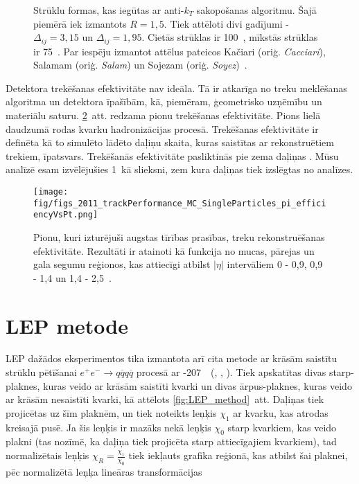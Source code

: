 \begin{figure}[hbtp]
  \def\twidth{0.5}
  \hfil%
   \caption{Strūklu formas, kas iegūtas ar anti-$k_{T}$ sakopošanas algoritmu. Šajā piemērā iek izmantots $R=1,5$. Tiek attēloti divi gadījumi - $\Delta_{ij}=3,15$ un  $\Delta_{ij}=1,95$. Cietās strūklas \pt ir 100~\GeV, mīkstās strūklas \pt ir 75~\GeV. Par iespēju izmantot attēlus pateicos Kačiari (oriģ. {\it Cacciari}), Salamam (oriģ. {\it Salam}) un Sojezam (oriģ. {\it Soyez})~\cite{github:antikt}.}
  \label{fig:anti_kt}
\end{figure}

Detektora trekēšanas efektivitāte nav ideāla. Tā ir atkarīga no treku meklēšanas algoritma un detektora īpašībām, kā, piemēram, ģeometrisko \gls{uzņēmību} un materiālu saturu. \ref{fig:2011_trackPerformance_MC_SingleParticles_pi_efficiencyVsPt}~att. redzama pionu trekēšanas efektivitāte. Pions lielā daudzumā rodas kvarku hadronizācijas procesā. Trekēšanas efektivitāte ir definēta kā to simulēto lādēto daļiņu skaita, kuras saistītas ar rekonstruētiem trekiem, īpatsvars. Trekēšanās efektivitāte pasliktinās pie zema daļiņas \pt. Mūsu analīzē esam izvēlējušies 1~\GeV kā \pt slieksni, zem kura daļiņas tiek izslēgtas no analīzes.

\begin{figure}[hbtp]
    \texttt{[image: fig/figs\_2011\_trackPerformance\_MC\_SingleParticles\_pi\_efficiencyVsPt.png]}
    \caption{Pionu, kuri izturējuši augstas tīrības prasības, treku rekonstruēšanas efektivitāte. Rezultāti ir atainoti kā funkcija no \pt mucas, pārejas un gala segumu reģionos, kas attiecīgi atbilst $\left|\eta\right|$ intervāliem 0 - 0,9, 0,9 - 1,4 un 1,4 - 2,5~\cite{Chatrchyan:2014fea}.}
    \label{fig:2011_trackPerformance_MC_SingleParticles_pi_efficiencyVsPt}
\end{figure}

\section{LEP metode}

LEP dažādos eksperimentos tika izmantota arī cita metode ar krāsām saistītu strūklu pētīšanai $e^{+}e^{-}\rightarrow q\overline{q}q\overline{q}$ procesā ar -207~\GeV~(\cite{Abdallah:2006uq}, \cite{Abbiendi:2005es}, \cite{Achard:2003pe}). Tiek apskatītas divas starp-\PW plaknes, kuras veido ar krāsām saistīti kvarki un divas ārpus-\PW plaknes, kuras veido ar krāsām nesaistīti kvarki, kā attēlots \ref{fig:LEP_method}~att. Daļiņas tiek projicētas uz šīm plaknēm, un tiek noteikts leņķis $\chi_{1}$ ar kvarku, kas atrodas kreisajā pusē. Ja šis leņķis ir mazāks nekā leņķis $\chi_{0}$ starp kvarkiem, kas veido plakni (tas nozīmē, ka daļiņa tiek projicēta starp attiecīgajiem kvarkiem), tad normalizētais leņķis $\chi_{R}=\frac{\chi_{1}}{\chi_{0}}$ tiek iekļauts grafika reģionā, kas atbilst šai plaknei, pēc normalizētā leņķa lineāras transformācijas

